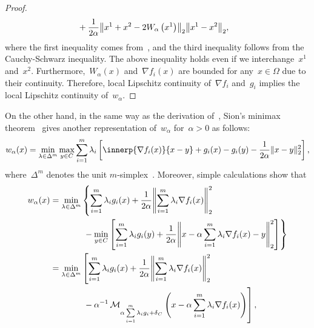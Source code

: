 \documentclass[../../main]{subfiles}
\begin{document}
\begin{proof}
\begin{align}
                       &+ \frac{1}{2 \alpha} \norm*{x^1 + x^2 - 2 W_\alpha\left(x^1\right)}_2 \norm*{x^1 - x^2}_2
                   ,\end{align} 
                   where the first inequality comes from~, and the third inequality follows from the Cauchy-Schwarz inequality.
                   The above inequality holds even if we interchange~$x^1$ and~$x^2$.
                   Furthermore,~$W_\alpha(x)$ and~$\nabla f_i(x)$ are bounded for any~$x \in \Omega$ due to their continuity.
                   Therefore, local Lipschitz continuity of~$\nabla f_i$ and~$g_i$ implies the local Lipschitz continuity of~$w_\alpha$.
               \end{proof}

               On the other hand, in the same way as the derivation of~, Sion's minimax theorem~\cite{Sion1958} gives another representation of~$w_\alpha$ for~$\alpha > 0$ as follows:
               \begin{equation} \label{eq:reg_lin_gap_MO_Sion}
                   w_\alpha(x) = \min_{\lambda \in \Delta^m} \max_{y \in C} \sum_{i = 1}^{m} \lambda_i \left[ \innerp{\nabla f_i(x)}{x - y} + g_i(x) - g_i(y) - \frac{1}{2 \alpha} \norm{x - y}_2^2 \right] 
               ,\end{equation} 
               where~$\Delta^m$ denotes the unit $m$-simplex~.
               Moreover, simple calculations show that
               \begin{equation}
                   \begin{alignedat}{2}
                       w_\alpha(x) &= \min_{\lambda \in \Delta^m} &&\left\{ \sum_{i = 1}^{m} \lambda_i g_i(x) + \frac{1}{2 \alpha} \norm*{\sum_{i = 1}^{m} \lambda_i \nabla f_i(x)}_2^2 \right. \\
                                   &&& \left. {}- \min_{y \in C} \left[ \sum_{i = 1}^{m} \lambda_i g_i(y) + \frac{1}{2 \alpha} \norm*{x - \alpha \sum_{i = 1}^{m} \lambda_i \nabla f_i(x) - y}_2^2 \right] \right\} \\
                                   &= \min_{\lambda \in \Delta^m} &&\left[ \sum_{i = 1}^{m} \lambda_i g_i(x) + \frac{1}{2 \alpha} \norm*{\sum_{i = 1}^{m} \lambda_i \nabla f_i(x)}_2^2 \right. \\
                                   &&& \left. {}- \alpha^{-1} \envelope_{\alpha \sum\limits_{i = 1}^{m} \lambda_i g_i + \indicator_C} \left( x - \alpha \sum_{i = 1}^{m} \lambda_i \nabla f_i(x) \right) \right]
                               ,\end{alignedat}
                           \end{equation} 
\end{document}
